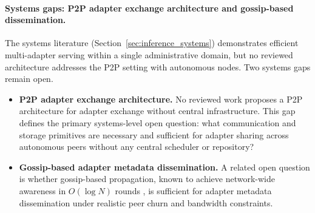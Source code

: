 \paragraph{Systems gaps: P2P adapter exchange architecture and gossip-based dissemination.}
The systems literature (Section~\ref{sec:inference_systems}) demonstrates efficient multi-adapter serving within a single administrative domain, but no reviewed architecture addresses the P2P setting with autonomous nodes. Two systems gaps remain open.
\begin{itemize}
  \item \textbf{P2P adapter exchange architecture.} No reviewed work proposes a P2P architecture for adapter exchange without central infrastructure. This gap defines the primary
    systems-level open question: what communication and storage primitives are
    necessary and sufficient for adapter sharing across autonomous peers without
    any central scheduler or repository?
  \item \textbf{Gossip-based adapter metadata dissemination.} A related open question
    is whether gossip-based propagation, known to achieve network-wide awareness
    in $O(\log N)$ rounds \citep{OrmandyGossip2013}, is sufficient for adapter
    metadata dissemination under realistic peer churn and bandwidth constraints.
\end{itemize}

